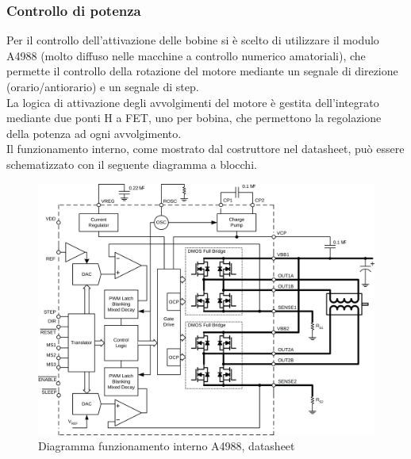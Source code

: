 \documentclass[12pt]{article}
\begin{document}
    
    
        \subsubsection{Controllo di potenza}
        Per il controllo dell'attivazione delle bobine si è scelto di utilizzare il modulo A4988 (molto diffuso nelle macchine a controllo numerico amatoriali), che permette il controllo della rotazione del motore mediante un segnale di direzione (orario/antiorario) e un segnale di step.\\
        La logica di attivazione degli avvolgimenti del motore è gestita dell'integrato mediante due ponti H a FET, uno per bobina, che permettono la regolazione della potenza ad ogni avvolgimento.\\
        Il funzionamento interno, come mostrato dal costruttore nel datasheet, può essere schematizzato con il seguente diagramma a blocchi.\\
        \begin{figure}[h]
        \centering
            \includegraphics[width=320pt]{Draws/A4988_functional_diagram.png}
            \caption{Diagramma funzionamento interno A4988, datasheet}
            \label{fig:A4988_diagram}
        \end{figure}
        
\end{document}
